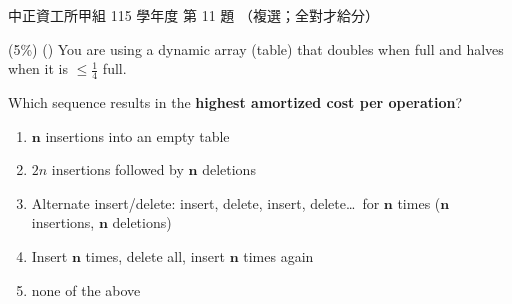 \begin{pastexam}[label={px:ccu-115-swa-01}]{中正資工所甲組 115 學年度 第 11 題}
（複選；全對才給分）

(5\%) (\qquad) You are using a dynamic array (table) that doubles when full and halves when it is
$\le\frac{1}{4}$ full.

Which sequence results in the \textbf{highest amortized cost per operation}?
\begin{enumerate}[label=(\alph*)]
\item $\boldsymbol{n}$ insertions into an empty table
\item $2n$ insertions followed by $\boldsymbol{n}$ deletions
\item Alternate insert/delete: insert, delete, insert, delete\ldots\ for $\boldsymbol{n}$ times
($\boldsymbol{n}$ insertions, $\boldsymbol{n}$ deletions)
\item Insert $\boldsymbol{n}$ times, delete all, insert $\boldsymbol{n}$ times again
\item none of the above
\end{enumerate}
\end{pastexam}


